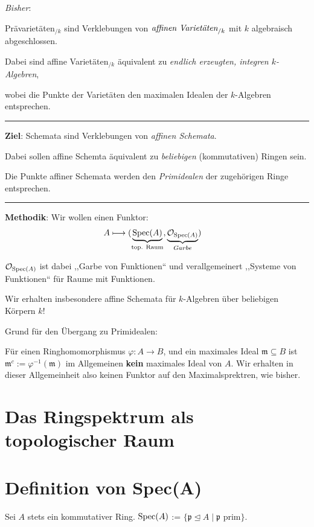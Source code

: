 \emph{Bisher}:

 Prävarietäten$_{/k}$ sind Verklebungen von $\emph{affinen Varietäten}_{/k}$ mit $k$ algebraisch abgeschlossen.

Dabei sind affine Varietäten$_{/k}$ äquivalent zu \emph{endlich erzeugten, integren
$k$-Algebren}, 

wobei die Punkte der Varietäten den maximalen Idealen der $k$-Algebren entsprechen.

\rule[0.5ex]{1\columnwidth}{1pt}

\textbf{Ziel}: 
Schemata sind Verklebungen von \emph{affinen Schemata}.

Dabei sollen affine Schemta äquivalent zu \emph{beliebigen} (kommutativen) Ringen sein. 

Die Punkte affiner Schemata werden den \emph{Primidealen} der zugehörigen Ringe entsprechen.

\rule[0.5ex]{1\columnwidth}{1pt}

\textbf{Methodik}: Wir wollen einen Funktor:
\begin{align*}
  A & \longmapsto (\underbrace{\operatorname{Spec}(A)}_{\text{top. Raum}}, \underbrace{\mathcal{O}_{\operatorname{Spec}(A)}}_{Garbe})
\end{align*}

$\mathcal{O}_{\operatorname{Spec}(A)}$ ist dabei ,,Garbe von Funktionen`` und verallgemeinert ,,Systeme von Funktionen``
für Raume mit Funktionen.

Wir erhalten insbesondere affine Schemata für $k$-Algebren über beliebigen Körpern $k$!

Grund für den Übergang zu Primidealen:

Für einen Ringhomomorphismus $\varphi:A\rightarrow B$, und ein maximales Ideal
$\mathfrak{m}\subseteq B$ ist $\mathfrak{m}^{c} := \varphi^{-1}(\mathfrak{m})$ im Allgemeinen \textbf{kein} maximales Ideal von $A$.
Wir erhalten in dieser Allgemeinheit also keinen Funktor auf den Maximalsprektren, wie bisher.

\section*{Das Ringspektrum als topologischer Raum}

\section{Definition von Spec(A)}
\label{sec:def-von-spec}

Sei $A$ stets ein kommutativer Ring. $\operatorname{Spec}(A)$ :=
$\{\mathfrak{p}\unlhd A \mid \mathfrak{p} \text{ prim}\}$.

